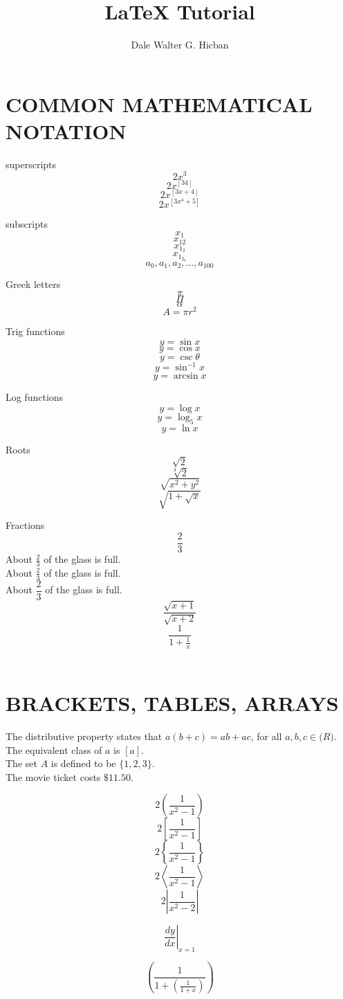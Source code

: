 \documentclass{article}
\title{LaTeX Tutorial}
\author{Dale Walter G. Hicban}
\begin{document}
\maketitle

\break

\section{COMMON MATHEMATICAL NOTATION}

superscripts $$2x^3$$
$$2x^[34]$$
$$2x^[  3x+4  ]$$
$$2x^[  3x^4+5  ]$$

subscripts
$$x_1$$
$$x_{12}$$
$$x_{1_2}$$
$$x_{  1_{2_3}  }$$
$$a_0, a_1, a_2, \ldots, a_{100}$$

Greek letters
$$\pi$$
$$\Pi$$
$$\alpha$$
$$A=\pi r^2$$

Trig functions
$$y=\sin x$$
$$y=\cos x$$
$$y=\csc \theta$$
$$y=\sin^{-1} x$$
$$y=\arcsin x$$

Log functions
$$y=\log x$$
$$y=\log_5 x$$
$$y=\ln x$$

Roots
$$\sqrt{2}$$
$$\sqrt[3]{2}$$
$$\sqrt{  x^2+y^2  }$$
$$\sqrt{ 1+\sqrt{x} }$$

Fractions
$$\frac{2}{3}$$
About $\frac{2}{3}$ of the glass is full.\\[6pt]
About $\displaystyle \frac{2}{3}$ of the glass is full.\\[6pt]
About $\dfrac{2}{3}$ of the glass is full.\\[6pt]

$$\frac{  \sqrt{x+1}  }{  \sqrt{x+2}  }$$
$$\frac{1}{  1+\frac{1}{x}  }$$\\[12pt]

\section{BRACKETS, TABLES, ARRAYS}
	The distributive property states that $a(b+c)=ab+ac$, for all $a, b, c \in \mathbb(R)$.\\[6pt]
	The equivalent class of $a$ is $[a]$.\\[6pt]
	The set $A$ is defined to be $\{1, 2, 3\}$.\\[6pt]
	The movie ticket costs $\$11.50$.

$$2\left(  \frac{1}{x^2-1}  \right)$$
$$2\left[  \frac{1}{x^2-1}  \right]$$
$$2\left\{  \frac{1}{x^2-1}  \right\}$$
$$2\left \langle \frac{1}{x^2-1}\right \rangle $$
$$2\left | \frac{1}{x^2-2}\right | $$

$$\left.\frac{dy}{dx}\right|_{x=1}$$

$$\left(  \frac{1}{1 + \left( \frac{1}{1+x} \right)}  \right)$$
\end{document}
